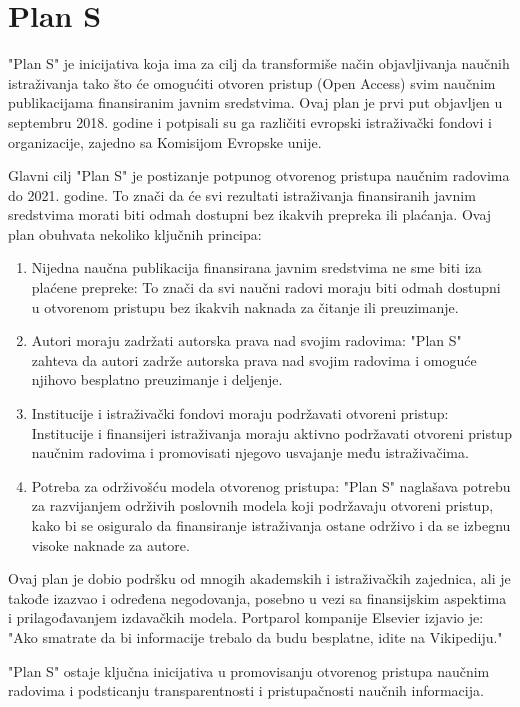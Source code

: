 \documentclass{article}
\begin{document}
\section{Plan S}

"Plan S" je inicijativa koja ima za cilj da transformiše način objavljivanja naučnih istraživanja tako što će omogućiti otvoren pristup (Open Access) svim naučnim publikacijama finansiranim javnim sredstvima. Ovaj plan je prvi put objavljen u septembru 2018. godine i potpisali su ga različiti evropski istraživački fondovi i organizacije, zajedno sa Komisijom Evropske unije.

Glavni cilj "Plan S" je postizanje potpunog otvorenog pristupa naučnim radovima do 2021. godine. To znači da će svi rezultati istraživanja finansiranih javnim sredstvima morati biti odmah dostupni bez ikakvih prepreka ili plaćanja. Ovaj plan obuhvata nekoliko ključnih principa:

\begin{enumerate}
    \item Nijedna naučna publikacija finansirana javnim sredstvima ne sme biti iza plaćene prepreke: To znači da svi naučni radovi moraju biti odmah dostupni u otvorenom pristupu bez ikakvih naknada za čitanje ili preuzimanje.
    \item Autori moraju zadržati autorska prava nad svojim radovima: "Plan S" zahteva da autori zadrže autorska prava nad svojim radovima i omoguće njihovo besplatno preuzimanje i deljenje.
    \item Institucije i istraživački fondovi moraju podržavati otvoreni pristup: Institucije i finansijeri istraživanja moraju aktivno podržavati otvoreni pristup naučnim radovima i promovisati njegovo usvajanje među istraživačima.
    \item Potreba za održivošću modela otvorenog pristupa: "Plan S" naglašava potrebu za razvijanjem održivih poslovnih modela koji podržavaju otvoreni pristup, kako bi se osiguralo da finansiranje istraživanja ostane održivo i da se izbegnu visoke naknade za autore.
\end{enumerate}

Ovaj plan je dobio podršku od mnogih akademskih i istraživačkih zajednica, ali je takođe izazvao i određena negodovanja, posebno u vezi sa finansijskim aspektima i prilagođavanjem izdavačkih modela. Portparol kompanije Elsevier izjavio je: "Ako smatrate da bi informacije trebalo da budu besplatne, idite na Vikipediju."


"Plan S" ostaje ključna inicijativa u promovisanju otvorenog pristupa naučnim radovima i podsticanju transparentnosti i pristupačnosti naučnih informacija.
\end{document}
